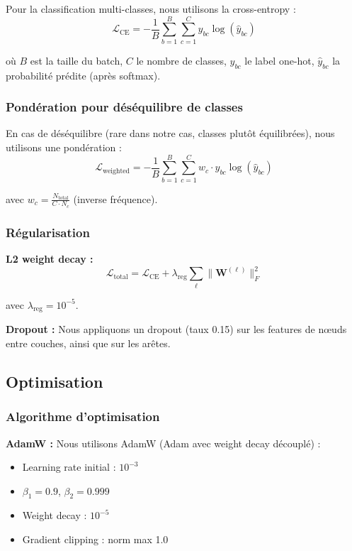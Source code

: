 Pour la classification multi-classes, nous utilisons la cross-entropy :
\[
\mathcal{L}_{\text{CE}} = -\frac{1}{B}\sum_{b=1}^B \sum_{c=1}^C y_{bc} \log(\hat{y}_{bc})
\]

où $B$ est la taille du batch, $C$ le nombre de classes, $y_{bc}$ le label one-hot, $\hat{y}_{bc}$ la probabilité prédite (après softmax).

\subsubsection{Pondération pour déséquilibre de classes}

En cas de déséquilibre (rare dans notre cas, classes plutôt équilibrées), nous utilisons une pondération :
\[
\mathcal{L}_{\text{weighted}} = -\frac{1}{B}\sum_{b=1}^B \sum_{c=1}^C w_c \cdot y_{bc} \log(\hat{y}_{bc})
\]

avec $w_c = \frac{N_{\text{total}}}{C \cdot N_c}$ (inverse fréquence).

\subsubsection{Régularisation}

\textbf{L2 weight decay :}
\[
\mathcal{L}_{\text{total}} = \mathcal{L}_{\text{CE}} + \lambda_{\text{reg}} \sum_{\ell} \|\mathbf{W}^{(\ell)}\|_F^2
\]

avec $\lambda_{\text{reg}} = 10^{-5}$.

\textbf{Dropout :}
Nous appliquons un dropout (taux 0.15) sur les features de nœuds entre couches, ainsi que sur les arêtes.

\subsection{Optimisation}

\subsubsection{Algorithme d'optimisation}

\textbf{AdamW :}
Nous utilisons AdamW (Adam avec weight decay découplé) :
\begin{itemize}
    \item Learning rate initial : $10^{-3}$
    \item $\beta_1 = 0.9$, $\beta_2 = 0.999$
    \item Weight decay : $10^{-5}$
    \item Gradient clipping : norm max 1.0
\end{itemize}

